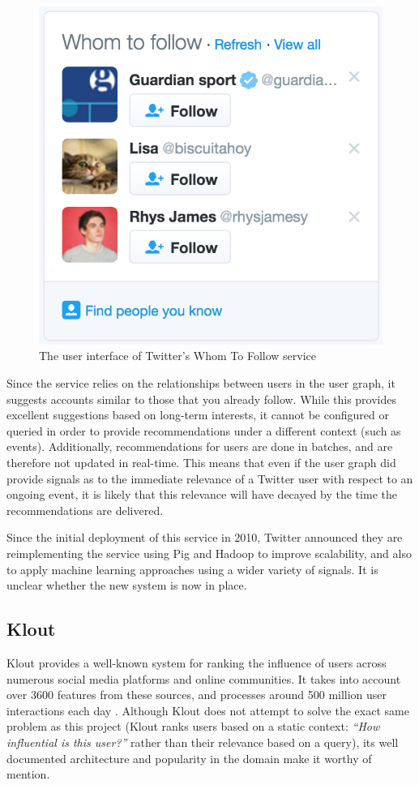 \documentclass{l4proj}
\begin{document}
\begin{figure}[H]
\centering
\includegraphics[scale=0.75]{whomtofollow.png}
\caption{The user interface of Twitter's Whom To Follow service}
\label{whomtofollow}
\end{figure}

Since the service relies on the relationships between users in the user graph, it suggests accounts similar to those that you already follow. While this provides excellent suggestions based on long-term interests, it cannot be configured or queried in order to provide recommendations under a different context (such as events). Additionally, recommendations for users are done in batches, and are therefore not updated in real-time. This means that even if the user graph did provide signals as to the immediate relevance of a Twitter user with respect to an ongoing event, it is likely that this relevance will have decayed by the time the recommendations are delivered.

Since the initial deployment of this service in 2010, Twitter announced they are reimplementing the service using Pig and Hadoop to improve scalability, and also to apply machine learning approaches using a wider variety of signals. It is unclear whether the new system is now in place.

\subsection{Klout}
Klout provides a well-known system for ranking the influence of users across numerous social media platforms and online communities. It takes into account over 3600 features from these sources, and processes around 500 million user interactions each day \cite{klout}. Although Klout does not attempt to solve the exact same problem as this project (Klout ranks users based on a static context: \textit{``How influential is this user?''} rather than their relevance based on a query), its well documented architecture and popularity in the domain make it worthy of mention.
\end{document}
